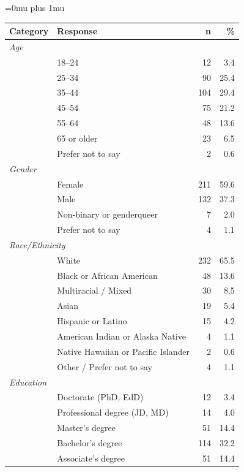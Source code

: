 \documentclass[letterpaper,twocolumn,10pt]{article}
\begin{document}
\Urlmuskip=0mu plus 1mu\relax
\def\UrlBreaks{\do\/\do_\do-}

{\footnotesize


}

\appendix

\begin{table}[htbp]
\centering
\footnotesize
\begin{tabular}{llrr}
\toprule[1pt]
\textbf{Category} & \textbf{Response} & \textbf{n} & \textbf{\%} \\
\midrule
\multicolumn{4}{l}{\textit{Age}} \\
 & 18--24 & 12 & 3.4 \\
 & 25--34 & 90 & 25.4 \\
 & 35--44 & 104 & 29.4 \\
 & 45--54 & 75 & 21.2 \\
 & 55--64 & 48 & 13.6 \\
 & 65 or older & 23 & 6.5 \\
 & Prefer not to say & 2 & 0.6 \\
\midrule
\multicolumn{4}{l}{\textit{Gender}} \\
 & Female & 211 & 59.6 \\
 & Male & 132 & 37.3 \\
 & Non-binary or genderqueer & 7 & 2.0 \\
 & Prefer not to say & 4 & 1.1 \\
\midrule
\multicolumn{4}{l}{\textit{Race/Ethnicity}} \\
 & White & 232 & 65.5 \\
 & Black or African American & 48 & 13.6 \\
 & Multiracial / Mixed & 30 & 8.5 \\
 & Asian & 19 & 5.4 \\
 & Hispanic or Latino & 15 & 4.2 \\
 & American Indian or Alaska Native & 4 & 1.1 \\
 & Native Hawaiian or Pacific Islander & 2 & 0.6 \\
 & Other / Prefer not to say & 4 & 1.1 \\
\midrule
\multicolumn{4}{l}{\textit{Education}} \\
 & Doctorate (PhD, EdD) & 12 & 3.4 \\
 & Professional degree (JD, MD) & 14 & 4.0 \\
 & Master's degree & 51 & 14.4 \\
 & Bachelor's degree & 114 & 32.2 \\
 & Associate's degree & 51 & 14.4 \\

\end{tabular}
\end{table}
\end{document}
